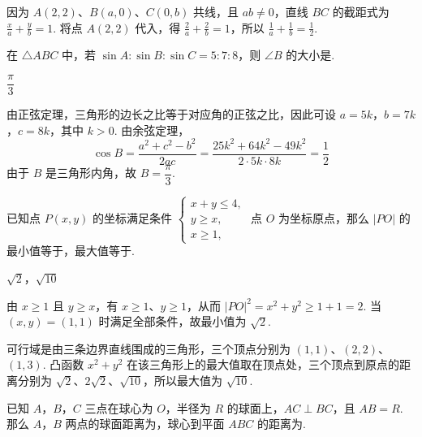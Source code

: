 \begin{solution}
因为 \(A(2,2)\)、\(B(a,0)\)、\(C(0,b)\) 共线，且 \(ab\ne0\)，直线 \(BC\) 的截距式为 \(\frac{x}{a}+\frac{y}{b}=1\). 将点 \(A(2,2)\) 代入，得 \(\frac2a+\frac2b=1\)，所以 \(\frac1a+\frac1b=\frac12\).
\end{solution}

\begin{problem}
在 \(\triangle ABC\) 中，若 \(\sin A:\sin B:\sin C=5:7:8\)，则 \(\angle B\) 的大小是\fillinblank{}.
\end{problem}

\begin{answer}
\(\dfrac{\pi}{3}\)
\end{answer}

\begin{solution}
由正弦定理，三角形的边长之比等于对应角的正弦之比，因此可设 \(a=5k\)，\(b=7k\)，\(c=8k\)，其中 \(k>0\).
由余弦定理，
\[
\cos B=\frac{a^2+c^2-b^2}{2ac}
=\frac{25k^2+64k^2-49k^2}{2\cdot5k\cdot8k}=\frac12
\]
由于 \(B\) 是三角形内角，故 \(B=\dfrac\pi3\).
\end{solution}

\begin{problem}
已知点 \(P(x,y)\) 的坐标满足条件 \(\begin{cases}
x+y\leqslant4,\\
y\geqslant x,\\
x\geqslant1,
\end{cases}\)
点 \(O\) 为坐标原点，那么 \(|PO|\) 的最小值等于\fillinblank{}，最大值等于\fillinblank{}.
\end{problem}

\begin{answer}
\(\sqrt{2}\)，\(\sqrt{10}\)
\end{answer}

\begin{solution}
由 \(x\geqslant1\) 且 \(y\geqslant x\)，有 \(x\geqslant1\)、\(y\geqslant1\)，从而 \(|PO|^2=x^2+y^2\geqslant1+1=2\).
当 \((x,y)=(1,1)\) 时满足全部条件，故最小值为 \(\sqrt2\).

可行域是由三条边界直线围成的三角形，三个顶点分别为 \((1,1)\)、\((2,2)\)、\((1,3)\). 凸函数 \(x^2+y^2\) 在该三角形上的最大值取在顶点处，三个顶点到原点的距离分别为 \(\sqrt2\)、\(2\sqrt2\)、\(\sqrt{10}\)，所以最大值为 \(\sqrt{10}\).
\end{solution}

\begin{problem}
已知 \(A\)，\(B\)，\(C\) 三点在球心为 \(O\)，半径为 \(R\) 的球面上，\(AC\perp BC\)，且 \(AB=R\). 那么 \(A\)，\(B\) 两点的球面距离为\fillinblank{}，球心到平面 \(ABC\) 的距离为\fillinblank{}.
\end{problem}

